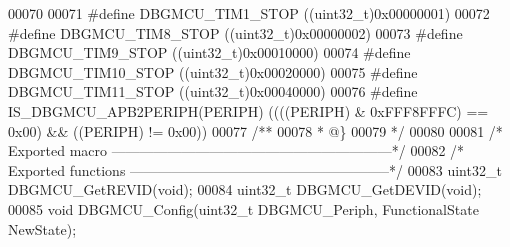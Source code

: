 \begin{DoxyCode}
00070 
00071 \textcolor{preprocessor}{#}\textcolor{preprocessor}{define} \textcolor{preprocessor}{DBGMCU\_TIM1\_STOP}             \textcolor{preprocessor}{(}\textcolor{preprocessor}{(}\textcolor{preprocessor}{uint32\_t}\textcolor{preprocessor}{)}0x00000001\textcolor{preprocessor}{)}
00072 \textcolor{preprocessor}{#}\textcolor{preprocessor}{define} \textcolor{preprocessor}{DBGMCU\_TIM8\_STOP}             \textcolor{preprocessor}{(}\textcolor{preprocessor}{(}\textcolor{preprocessor}{uint32\_t}\textcolor{preprocessor}{)}0x00000002\textcolor{preprocessor}{)}
00073 \textcolor{preprocessor}{#}\textcolor{preprocessor}{define} \textcolor{preprocessor}{DBGMCU\_TIM9\_STOP}             \textcolor{preprocessor}{(}\textcolor{preprocessor}{(}\textcolor{preprocessor}{uint32\_t}\textcolor{preprocessor}{)}0x00010000\textcolor{preprocessor}{)}
00074 \textcolor{preprocessor}{#}\textcolor{preprocessor}{define} \textcolor{preprocessor}{DBGMCU\_TIM10\_STOP}            \textcolor{preprocessor}{(}\textcolor{preprocessor}{(}\textcolor{preprocessor}{uint32\_t}\textcolor{preprocessor}{)}0x00020000\textcolor{preprocessor}{)}
00075 \textcolor{preprocessor}{#}\textcolor{preprocessor}{define} \textcolor{preprocessor}{DBGMCU\_TIM11\_STOP}            \textcolor{preprocessor}{(}\textcolor{preprocessor}{(}\textcolor{preprocessor}{uint32\_t}\textcolor{preprocessor}{)}0x00040000\textcolor{preprocessor}{)}
00076 \textcolor{preprocessor}{#}\textcolor{preprocessor}{define} \textcolor{preprocessor}{IS\_DBGMCU\_APB2PERIPH}\textcolor{preprocessor}{(}\textcolor{preprocessor}{PERIPH}\textcolor{preprocessor}{)} \textcolor{preprocessor}{(}\textcolor{preprocessor}{(}\textcolor{preprocessor}{(}\textcolor{preprocessor}{(}\textcolor{preprocessor}{PERIPH}\textcolor{preprocessor}{)} \textcolor{preprocessor}{&} 0xFFF8FFFC\textcolor{preprocessor}{)} \textcolor{preprocessor}{==} 0x00\textcolor{preprocessor}{)} \textcolor{preprocessor}{&&} \textcolor{preprocessor}{(}\textcolor{preprocessor}{(}\textcolor{preprocessor}{PERIPH}\textcolor{preprocessor}{)} \textcolor{preprocessor}{!=} 0x00\textcolor{preprocessor}{)}\textcolor{preprocessor}{)}
00077 \textcolor{comment}{/**}
00078 \textcolor{comment}{  * @\}}
00079 \textcolor{comment}{  */}
00080 
00081 \textcolor{comment}{/* Exported macro ------------------------------------------------------------*/}
00082 \textcolor{comment}{/* Exported functions --------------------------------------------------------*/}
00083 uint32\_t DBGMCU_GetREVID(\textcolor{keywordtype}{void});
00084 uint32\_t DBGMCU_GetDEVID(\textcolor{keywordtype}{void});
00085 \textcolor{keywordtype}{void} DBGMCU_Config(uint32\_t DBGMCU\_Periph, FunctionalState NewState);

\end{DoxyCode}
